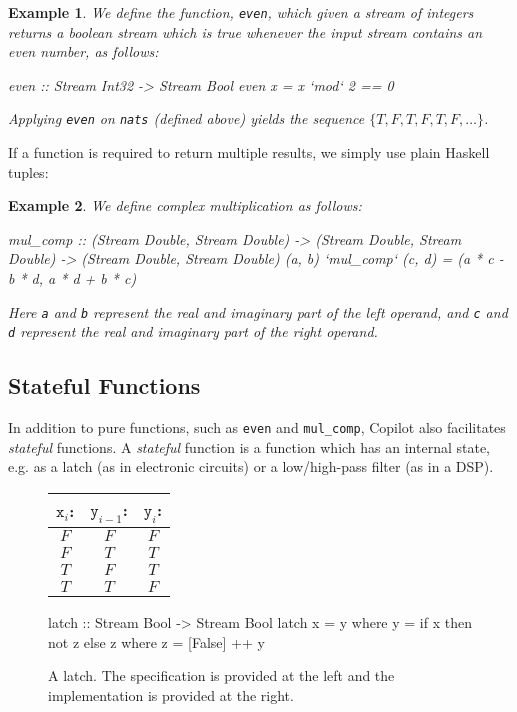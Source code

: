\documentclass[]{article}
\theoremstyle{example}
\newtheorem{example}{Example}
\begin{document}
\begin{example}
We define the function, {\tt even}, which given a stream of
integers returns a boolean stream which is true whenever the input stream
contains an even number, as follows:
%
\begin{code}
even :: Stream Int32 -> Stream Bool
even x = x `mod` 2 == 0
\end{code}
%
Applying {\tt even} on {\tt nats} (defined above) yields the sequence
$\{T, F, T, F, T, F, \dots\}$.
\end{example}

If a function is required to return multiple results, we simply use plain
Haskell tuples:

\begin{example}
We define complex multiplication as follows:
%
\begin{code}
mul_comp
  :: (Stream Double, Stream Double)
  -> (Stream Double, Stream Double)
  -> (Stream Double, Stream Double)
(a, b) `mul_comp` (c, d) = (a * c - b * d, a * d + b * c)
\end{code}
%
Here {\tt a} and {\tt b} represent the real and imaginary part of the left
operand, and {\tt c} and {\tt d} represent the real and imaginary part
of the right operand.
\end{example}

\subsection{Stateful Functions} \label{sec:stateful}

In addition to pure functions, such as {\tt even} and {\tt mul\_comp},
Copilot also facilitates \emph{stateful} functions. A \emph{stateful} function
is a function which has an internal state, e.g. as a latch (as in electronic
circuits) or a low/high-pass filter (as in a DSP).

\begin{figure*}
\begin{minipage}{0.4\linewidth}
\begin{tabular}{c|c||c}
$\mathtt{x}_i$: & $\mathtt{y}_{i-1}$: & $\mathtt{y}_i$:\\
\hline
$F$ & $F$ & $F$ \\
\hline
$F$ & $T$ & $T$ \\
\hline
$T$ & $F$ & $T$ \\
\hline
$T$ & $T$ & $F$
\end{tabular}
\end{minipage}
\hspace{1cm}
\begin{minipage}{0.6\linewidth}
\begin{code}
latch :: Stream Bool -> Stream Bool
latch x = y
  where
  y = if x then not z else z
    where
    z = [False] ++ y
\end{code}
\end{minipage}
\caption{A latch. The specification is provided at the left and the
implementation is provided at the right.}
\label{fig:jk_latch}
\end{figure*}
\end{document}
